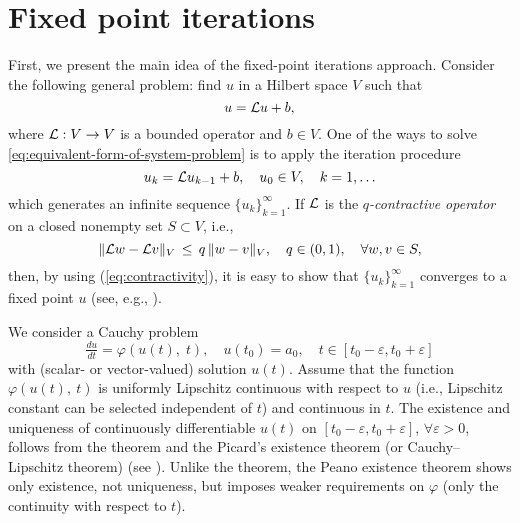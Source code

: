 \section{Fixed point iterations}

First, we present the main idea of the fixed-point iterations approach.
Consider the following general problem: find $u$ in a Hilbert space $V$ such that
%
\begin{equation}
    u = \operL u + b,
    \label{eq:equivalent-form-of-system-problem}
\end{equation}
%
where $\mathcal{L}: V \rightarrow V$ is a bounded operator and $b \in V$. One of the ways to 
solve \eqref{eq:equivalent-form-of-system-problem} is to apply the iteration procedure
%
\begin{equation*}
  u_k = \operL u_{k-1} + b, \quad u_0 \in V, \quad k = 1, \ldots
\end{equation*}
%
which generates an infinite sequence $\{u_k\}_{k = 1}^\infty$. If $\mathcal{L}$ is the 
{\em $q$-contractive operator} on a closed nonempty set $S \subset V$, i.e.,
%
\begin{equation}
   \|\operL w - \operL v\|_V \,\leq\, q \, \|w - v\|_V, \quad q \in (0, 1), 
		\quad \forall w, v \in S,
    \label{eq:contractivity}
\end{equation}
%
then, by using (\ref{eq:contractivity}), it is easy to show that 
$\{u_k\}_{k = 1}^\infty$ converges to a fixed point $u$ (see, e.g., 
\cite{Banach1922,Collatz1964,KolmogorovFomin1975,Istratescu1981,Zeidler1986}).

\label{ssec:pl-method}
We consider a Cauchy problem
%
\begin{equation}
  \tfrac{du}{dt} = \varphi(u(t),\;t),\quad u(t_0) = a_0, \quad 
	t \in [t_0 - \varepsilon, t_0 + \varepsilon]
  \label{eq:cauchy-problem}
\end{equation}
%
with (scalar- or vector-valued) solution $u(t)$. Assume that the function 
$\varphi(u(t),\:t)$ is uniformly Lipschitz continuous with respect to $u$ (i.e., 
Lipschitz constant can be selected independent of $t$) and continuous in $t$. The 
existence and uniqueness of continuously differentiable $u(t)$ on 
$[t_0 - \varepsilon, t_0 + \varepsilon]$, 
$\forall \varepsilon > 0$, follows from the \PL theorem and the Picard's existence 
theorem (or Cauchy--Lipschitz theorem) (see \cite{CoddingtonLevinson1972,Lindelof1894}).
%
Unlike the \PL theorem, the Peano existence theorem \cite{Peano1886} shows only existence, not uniqueness, but imposes weaker requirements on $\varphi$ (only the continuity with respect to $t$).

